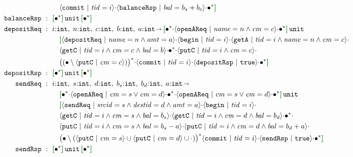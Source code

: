 {\begin{align*}
  \\ & \quad \msg{commit}{\I{tid}=i}\seqA\msg{balanceRsp}{\I{bal}=b_s+b_c}\seqA\allA\effR{}
  \\
  \eff{balanceRsp} ~:~{}
  & \effLR{\allA}\,\Code{unit}\,\effLR{\allA}
  \\
  \eff{depositReq} ~:~{}
  & i{:}\Int,\; n{:}\Int,\; c{:}\Int,\; b{:}\Int,\; a{:}\Int \sarr \effLR{\allA\seqA\msg{openAReq}{\I{name}=n\land\I{cm}=c}\seqA\allA}\,\Code{unit}\,
  \\ & \quad
    \effL{}\msg{depositReq}{\I{name}=n\land\I{amt}=a}\seqA\msg{begin}{\I{tid}=i}\seqA\msg{getA}{\I{tid}=i\land\I{name}=n\land\I{cm}=c}\seqA
  \\ & \quad \msg{getC}{\I{tid}=i\land\I{cm}=c\land\I{bal}=b}\seqA \allA \seqA\msg{putC}{\I{tid}=i\land\I{cm}=c}\seqA
  \\ & \quad \SNegStar{\msg{putC}{\I{cm}=c}}\seqA\msg{commit}{\I{tid}=i}\seqA\msg{depositRsp}{\true}\seqA\allA\effR{}
  \\
  \eff{depositRsp} ~:~{}
  & \effLR{\allA}\,\Code{unit}\,\effLR{\allA}
  \\
  \eff{sendReq} ~:~{}
  & i{:}\Int,\; s{:}\Int,\; d{:}\Int,\; b_s{:}\Int,\; b_d{:}\Int,\; a{:}\Int \sarr {}
  \\ & \quad
    \effLR{\allA\seqA\msg{openAReq}{\I{cm}=s\lor\I{cm}=d}\seqA\allA\seqA\msg{openAReq}{\I{cm}=s\lor\I{cm}=d}\seqA\allA}\,\Code{unit}\,
  \\ & \quad
    \effL{}\msg{sendReq}{\I{srcid}=s\land\I{destid}=d\land\I{amt}=a}\seqA\msg{begin}{\I{tid}=i}\seqA
  \\ & \quad \msg{getC}{\I{tid}=i\land\I{cm}=s\land\I{bal}=b_s}\seqA\msg{getC}{\I{tid}=i\land\I{cm}=d\land\I{bal}=b_d}\seqA \allA \seqA
  \\ & \quad \msg{putC}{\I{tid}=i\land\I{cm}=s\land\I{bal}=b_s-a}\seqA\msg{putC}{\I{tid}=i\land\I{cm}=d\land\I{bal}=b_d+a}\seqA
  \\ & \quad \SNegStarUU{\msg{putC}{\I{cm}=s}}{\msg{putC}{\I{cm}=d}}\seqA\msg{commit}{\I{tid}=i}\seqA\msg{sendRsp}{\true}\seqA\allA\effR{}
  \\
  \eff{sendRsp} ~:~{}
  & \effLR{\allA}\,\Code{unit}\,\effLR{\allA}
  \\
\end{align*}}
\vspace{-.4cm}\par\nobreak\noindent

